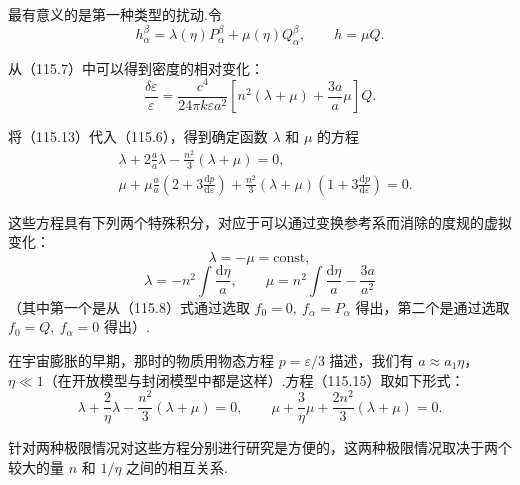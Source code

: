 最有意义的是第一种类型的扰动.令
\begin{equation}
  h_{\alpha}^{\beta}=\lambda(\eta)P_{\alpha}^{\beta}
  +\mu(\eta)Q_{\alpha}^{\beta},\qquad h=\mu Q.
\end{equation}

从（115.7）中可以得到密度的相对变化：
\begin{equation}
  \frac{\delta\varepsilon}{\varepsilon}
  =\frac{c^{4}}{24\pi k\varepsilon a^{2}}
  \left[n^{2}(\lambda+\mu)+\frac{3a}{a}\mu\right]Q.
\end{equation}

将（115.13）代入（115.6），得到确定函数 $\lambda$ 和 $\mu$ 的方程
\begin{equation}
  \begin{aligned}
    &\lambda+2\frac{a}{a}\lambda
    -\frac{n^{2}}{3}(\lambda+\mu)=0,\\
    &\mu+\mu\frac{a}{a}
    \left(2+3\frac{\mathrm{d}p}{\mathrm{d}\varepsilon}\right)
    +\frac{n^{2}}{3}(\lambda+\mu)
    \left(1+3\frac{\mathrm{d}p}{\mathrm{d}\varepsilon}\right)=0.
  \end{aligned}
\end{equation}

这些方程具有下列两个特殊积分，对应于可以通过变换参考系而消除的度规的虚拟变化：
\begin{equation}
  \lambda=-\mu=\mathrm{const},
\end{equation}
\begin{equation}
  \lambda=-n^{2}\int\frac{\mathrm{d}\eta}{a},\qquad
  \mu=n^{2}\int\frac{\mathrm{d}\eta}{a}-\frac{3a}{a^{2}}
\end{equation}
（其中第一个是从（115.8）式通过选取 $f_{0}=0,\ f_{\alpha}=P_{\alpha}$ 得出，第二个是通过选取 $f_{0}=Q,\ f_{\alpha}=0$ 得出）.

在宇宙膨胀的早期，那时的物质用物态方程 $p=\varepsilon/3$ 描述，我们有 $a\approx a_{1}\eta$，$\eta\ll1$（在开放模型与封闭模型中都是这样）.方程（115.15）取如下形式：
\begin{equation}
  \lambda+\frac{2}{\eta}\lambda
  -\frac{n^{2}}{3}(\lambda+\mu)=0,\qquad
  \mu+\frac{3}{\eta}\mu
  +\frac{2n^{2}}{3}(\lambda+\mu)=0.
\end{equation}

针对两种极限情况对这些方程分别进行研究是方便的，这两种极限情况取决于两个较大的量 $n$ 和 $1/\eta$ 之间的相互关系.

